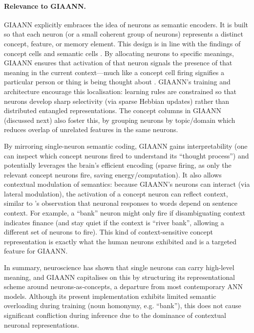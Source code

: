 \paragraph{Relevance to GIAANN.}
GIAANN explicitly embraces the idea of neurons as semantic encoders.
It is built so that each neuron (or a small coherent group of neurons) represents a distinct concept, feature, or memory element.
This design is in line with the findings of concept cells \citep{quianQuiroga2012conceptCells} and semantic cells \citep{jamali2024semantic_encoding}.
By allocating neurons to specific meanings, GIAANN ensures that activation of that neuron signals the presence of that meaning in the current context---much like a concept cell firing signifies a particular person or thing is being thought about \citep{quianQuiroga2012conceptCells,quiroga2005concept}.
GIAANN’s training and architecture encourage this localisation: learning rules are constrained so that neurons develop sharp selectivity (via sparse Hebbian updates) rather than distributed entangled representations.
The concept columns in GIAANN (discussed next) also foster this, by grouping neurons by topic/domain which reduces overlap of unrelated features in the same neurons.

By mirroring single-neuron semantic coding, GIAANN gains interpretability (one can inspect which concept neurons fired to understand its ``thought process'') and potentially leverages the brain’s efficient encoding (sparse firing, as only the relevant concept neurons fire, saving energy/computation).
It also allows contextual modulation of semantics: because GIAANN's neurons can interact (via lateral modulation), the activation of a concept neuron can reflect context, similar to \citeauthor{jamali2024semantic_encoding}'s observation that neuronal responses to words depend on sentence context.
For example, a ``bank'' neuron might only fire if disambiguating context indicates finance (and stay quiet if the context is ``river bank'', allowing a different set of neurons to fire).
This kind of context-sensitive concept representation is exactly what the human neurons exhibited and is a targeted feature for GIAANN.

In summary, neuroscience has shown that single neurons can carry high-level meaning, and GIAANN capitalises on this by structuring its representational scheme around neurons-as-concepts, a departure from most contemporary ANN models. Although its present implementation exhibits limited semantic overloading during training (noun homonymy, e.g. ``bank''), this does not cause significant confliction during inference due to the dominance of contextual neuronal representations.

